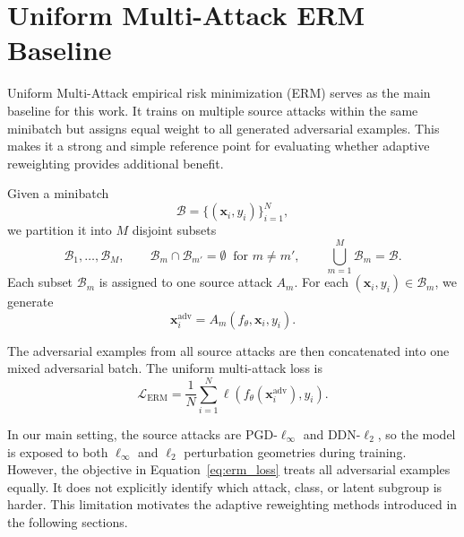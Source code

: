 \section{Uniform Multi-Attack ERM Baseline}
\label{sec:ch4_multi_attack_erm}

Uniform Multi-Attack empirical risk minimization (ERM) serves as the main baseline
for this work. It trains on multiple source attacks within the same minibatch but
assigns equal weight to all generated adversarial examples. This makes it a strong
and simple reference point for evaluating whether adaptive reweighting provides
additional benefit.

Given a minibatch
\[
    \mathcal{B} = \{(\mathbf{x}_i,y_i)\}_{i=1}^{N},
\]
we partition it into \(M\) disjoint subsets
\[
    \mathcal{B}_1,\ldots,\mathcal{B}_M,
    \qquad
    \mathcal{B}_m \cap \mathcal{B}_{m'} = \emptyset
    \;\; \text{for } m\ne m',
    \qquad
    \bigcup_{m=1}^{M}\mathcal{B}_m = \mathcal{B}.
\]
Each subset \(\mathcal{B}_m\) is assigned to one source attack \(A_m\). For each
\((\mathbf{x}_i,y_i)\in\mathcal{B}_m\), we generate
\[
    \mathbf{x}_i^{\mathrm{adv}}
    =
    A_m(f_\theta,\mathbf{x}_i,y_i).
\]

The adversarial examples from all source attacks are then concatenated into one mixed
adversarial batch. The uniform multi-attack loss is
\begin{equation}
    \mathcal{L}_{\mathrm{ERM}}
    =
    \frac{1}{N}
    \sum_{i=1}^{N}
    \ell\!\left(
        f_\theta(\mathbf{x}_i^{\mathrm{adv}}),
        y_i
    \right).
    \label{eq:erm_loss}
\end{equation}

In our main setting, the source attacks are PGD-\(\ell_\infty\) and DDN-\(\ell_2\),
so the model is exposed to both \(\ell_\infty\) and \(\ell_2\) perturbation
geometries during training. However, the objective in
Equation~\eqref{eq:erm_loss} treats all adversarial examples equally. It does not
explicitly identify which attack, class, or latent subgroup is harder. This limitation
motivates the adaptive reweighting methods introduced in the following sections.
